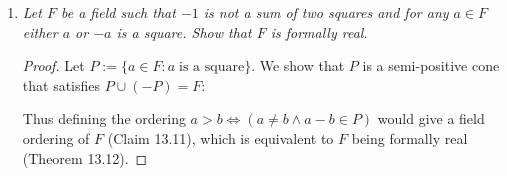 \documentclass{article}
\begin{document}
\begin{enumerate}[label={\bf Q\arabic*:}]
\begin{proof}
      Thus from compactness theorem, $T:= T_{\mathbb{Q}(t),\mathcal{L}}\cup
      T_{\text{lin ring}}\cup T_{t>\mathbb{Q}}$ is satisfiable. Any model
      that satisfies $T$ must embed $\mathbb{Q}(t)$ elementarily as a field
      since this model satisfies the complete diagram of $\mathbb{Q}(t)$ in
      the language $\mathcal{L}$ of fields. Also, since a subset of a set
      that satisfies $T_{\text{lin ring}}$ will also satisfy $T_{\text{lin
      ring}}$, the embedded $\mathbb{Q}(t)$ will be an ordered field.
      Finally, this embedded $\mathbb{Q}(t)$ will contain $t$ that
      satisfies $T_{t>\mathbb{Q}}$, and thus have an ordering where $t$ is
      larger than all rationals in $\mathbb{Q}$.
    \end{proof}

  \item \it Let $F$ be a field such that $-1$ is not a sum of two squares
    and for any $a\in F$ either $a$ or $-a$ is a square. Show that $F$ is
    formally real.

    \begin{proof}
      Let $P:= \{a\in F:a\; \text{is a square}\}$. We show that $P$ is a
      semi-positive cone that satisfies $P\cup(-P)=F$:

      Thus defining the ordering $a>b\Leftrightarrow (a\neq b \wedge a-b\in
      P)$ would give a field ordering of $F$ (Claim 13.11), which is
      equivalent to $F$ being formally real (Theorem 13.12).
    \end{proof}
\end{enumerate}
\end{document}

